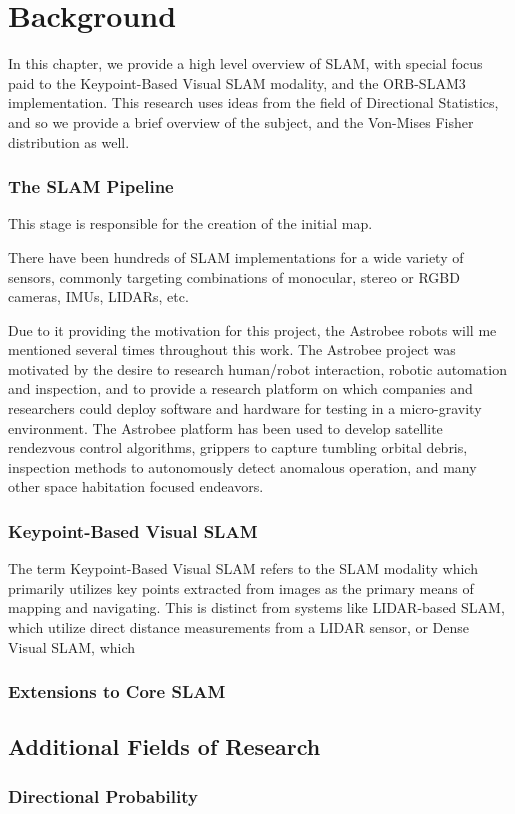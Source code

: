 \section{Background}
\label{background}

In this chapter, we provide a high level overview of SLAM, with special focus paid to the Keypoint-Based Visual SLAM modality, and the ORB-SLAM3 implementation. This research uses ideas from the field of Directional Statistics, and so we provide a brief overview of the subject, and the Von-Mises Fisher distribution as well.



\subsubsection{The SLAM Pipeline}

This stage is responsible for the creation of the initial map.

There have been hundreds of SLAM implementations for a wide variety of sensors, commonly targeting combinations of monocular, stereo or RGBD cameras, IMUs, LIDARs, etc.

Due to it providing the motivation for this project, the Astrobee robots will me mentioned several times throughout this work. The Astrobee project was motivated by the desire to research human/robot interaction, robotic automation and inspection, and to provide a research platform on which companies and researchers could deploy software and hardware for testing in a micro-gravity environment. The Astrobee platform has been used to develop satellite rendezvous control algorithms, grippers to capture tumbling orbital debris, inspection methods to autonomously detect anomalous operation, and many other space habitation focused endeavors.

\subsubsection{Keypoint-Based Visual SLAM}

The term Keypoint-Based Visual SLAM refers to the SLAM modality which primarily utilizes key points extracted from images as the primary means of mapping and navigating. This is distinct from systems like LIDAR-based SLAM, which utilize direct distance measurements from a LIDAR sensor, or Dense Visual SLAM, which

\subsubsection{Extensions to Core SLAM}

\subsection{Additional Fields of Research}

\subsubsection{Directional Probability}